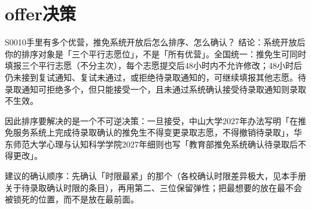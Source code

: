 \section{offer决策}
\begin{qa}{S0010}{手里有多个优营，推免系统开放后怎么排序、怎么确认？}
结论：系统开放后你的排序对象是「三个平行志愿位」，不是「所有优营」。全国统一：推免生可同时填报三个平行志愿（不分主次），每个志愿提交后48小时内不允许修改；48小时后仍未接到复试通知、复试未通过，或拒绝待录取通知的，可继续填报其他志愿。待录取通知可拒绝多个，但只能接受一个，且未通过系统确认接受待录取通知则录取不生效。

因此排序要解决的是一个不可逆决策：一旦接受，中山大学2027年办法写明「在推免服务系统上完成待录取确认的推免生不得变更录取志愿，不得撤销待录取」，华东师范大学心理与认知科学学院2027年细则也写「教育部推免系统确认待录取后不得更改」。

建议的确认顺序：先确认「时限最紧」的那个（各校确认时限差异极大，见本手册关于待录取确认时限的条目），再用第二、三位保留弹性；把最想要的放在最不会被锁死的位置，而不是放在最前面。
\end{qa}

